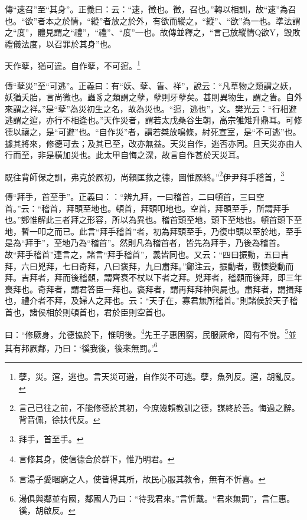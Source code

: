 {\noindent\zhuan{}\fzbyks 傳“速召”至“其身”。正義曰：云：“速，徵也。徵，召也。”轉以相訓，故“速”為召也。“欲”者本之於情，“縱”者放之於外，有欲而縱之，“縱”、“欲”為一也。準法謂之“度”，體見謂之“禮”，“禮”、“度”一也。故傳並釋之，“言己放縱情Q欲Y，毀敗禮儀法度，以召罪於其身”也。 \par}

天作孽，猶可違。自作孽，不可逭。\footnote{孽，災。逭，逃也。言天災可避，自作災不可逃。孽，魚列反。逭，胡亂反。}

{\noindent\zhuan{}\fzbyks 傳“孽災”至“可逃”。正義曰：有“妖、孽、眚、祥”，說云：“凡草物之類謂之妖，妖猶夭胎，言尚微也。蟲豸之類謂之孽，孽則牙孽矣。甚則異物生，謂之眚。自外來謂之祥。”是“孽”為災初生之名，故為災也。“逭，逃也”，文。樊光云：“行相避逃謂之逭，亦行不相逢也。”天作災者，謂若太戊桑谷生朝，高宗雊雉升鼎耳。可修德以禳之，是“可避”也。“自作災”者，謂若桀放鳴條，紂死宣室，是“不可逃”也。據其將來，修德可去；及其已至，改亦無益。天災自作，逃否亦同。且天災亦由人行而至，非是橫加災也。此太甲自悔之深，故言自作甚於天災耳。 \par}

既往背師保之訓，弗克於厥初，尚賴匡救之德，圖惟厥終。”\footnote{言己已往之前，不能修德於其初，今庶幾賴教訓之德，謀終於善。悔過之辭。背音佩，徐扶代反。}伊尹拜手稽首，\footnote{拜手，首至手。}

{\noindent\zhuan{}\fzbyks 傳“拜手，首至手”。正義曰：：“辨九拜，一曰稽首，二曰頓首，三曰空首。”云：“稽首，拜頭至地也。頓首，拜頭叩地也。空首，拜頭至手，所謂拜手也。”鄭惟解此三者拜之形容，所以為異也。稽首頭至地，頭下至地也。頓首頭下至地，暫一叩之而已。此言“拜手稽首”者，初為拜頭至手，乃復申頭以至於地，至手是為“拜手”，至地乃為“稽首”。然則凡為稽首者，皆先為拜手，乃後為稽首。故“拜手稽首”連言之，諸言“拜手稽首”，義皆同也。又云：“四曰振動，五曰吉拜，六曰兇拜，七曰奇拜，八曰褒拜，九曰肅拜。”鄭注云，振動者，戰慄變動而拜。吉拜者，拜而後稽顙，謂齊衰不杖以下者之拜。兇拜者，稽顙而後拜，即三年喪拜也。奇拜者，謂君答臣一拜也。褒拜者，謂再拜拜神與屍也。肅拜者，謂揖拜也，禮介者不拜，及婦人之拜也。云：“天子在，寡君無所稽首。”則諸侯於天子稽首也，諸侯相於則頓首也，君於臣則空首也。 \par}

曰：“修厥身，允德協於下，惟明後。\footnote{言修其身，使信德合於群下，惟乃明君。}先王子惠困窮，民服厥命，罔有不悅。\footnote{言湯子愛睏窮之人，使皆得其所，故民心服其教令，無有不忻喜。}並其有邦厥鄰，乃曰：‘徯我後，後來無罰。’\footnote{湯俱與鄰並有國，鄰國人乃曰：“待我君來。”言忻戴。“君來無罰”，言仁惠。徯，胡啟反。}

